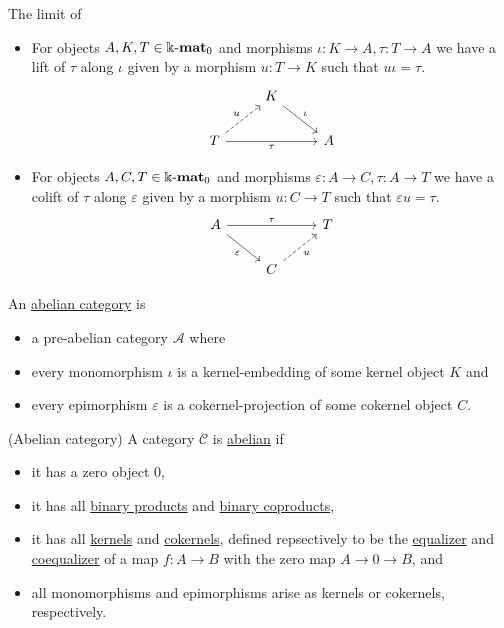 \begin{definition} The limit of 
\begin{itemize}
\item For objects $A, K, T \in \Bbbk\textnormal{-}\mathbf{mat}_{0}$ and morphisms $\iota : K \rightarrow A, \tau : T \rightarrow A$ we have a lift of $\tau$ along $\iota$
given by a morphism $u : T \rightarrow K$ such that $u \iota = \tau$.
\[
\begin{tikzcd}
                                              & K \arrow[rd, "\iota"] &   \\
T \arrow[rr, "\tau"'] \arrow[ru, "u", dashed] &                       & A
\end{tikzcd}
\]
\item For objects $A,C,T \in \Bbbk\textnormal{-}\mathbf{mat}_{0}$ and morphisms $\varepsilon : A \rightarrow C, \tau : A \rightarrow T$ we have a colift of $\tau$ along
$\varepsilon$ given by a morphism $u : C \rightarrow T$ such that $\varepsilon u = \tau$.
\[
\begin{tikzcd}
A \arrow[rr, "\tau"] \arrow[rd, "\varepsilon"'] &                            & T \\
                                                & C \arrow[ru, "u"', dashed] &  
\end{tikzcd}
\]
\end{itemize}
\end{definition}

\begin{definition}\label{def:abelian_category}
An \ul{abelian category} is
\begin{itemize}
\item a pre-abelian category $\mathcal{A}$ where
\item every monomorphism $\iota$ is a kernel-embedding of some kernel object $K$ and
\item every epimorphism $\varepsilon$ is a cokernel-projection of some cokernel object $C$.
\end{itemize}
\end{definition}

\begin{definition}{(Abelian category)}
A category $\mathcal{C}$ is \ul{abelian} if
\begin{itemize}
\item it has a zero object $0$,
\item it has all \ul{binary products} and \ul{binary coproducts},
\item it has all \ul{kernels} and \ul{cokernels}, defined repsectively to be the \ul{equalizer} and
\ul{coequalizer} of a map $f : A \rightarrow B$ with the zero map $A \rightarrow 0 \rightarrow B$, and
\item all monomorphisms and epimorphisms arise as kernels or cokernels, respectively.
\end{itemize}
\end{definition}

